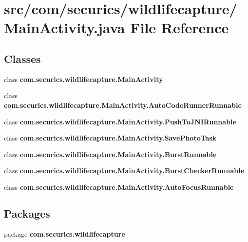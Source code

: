 \section{src/com/securics/wildlifecapture/\+Main\+Activity.java File Reference}
\label{_main_activity_8java}
\subsection*{Classes}
\begin{DoxyCompactItemize}
\item 
class {\bf com.\+securics.\+wildlifecapture.\+Main\+Activity}
\item 
class {\bf com.\+securics.\+wildlifecapture.\+Main\+Activity.\+Auto\+Code\+Runner\+Runnable}
\item 
class {\bf com.\+securics.\+wildlifecapture.\+Main\+Activity.\+Push\+To\+J\+N\+I\+Runnable}
\item 
class {\bf com.\+securics.\+wildlifecapture.\+Main\+Activity.\+Save\+Photo\+Task}
\item 
class {\bf com.\+securics.\+wildlifecapture.\+Main\+Activity.\+Burst\+Runnable}
\item 
class {\bf com.\+securics.\+wildlifecapture.\+Main\+Activity.\+Burst\+Checker\+Runnable}
\item 
class {\bf com.\+securics.\+wildlifecapture.\+Main\+Activity.\+Auto\+Focus\+Runnable}
\end{DoxyCompactItemize}
\subsection*{Packages}
\begin{DoxyCompactItemize}
\item 
package {\bf com.\+securics.\+wildlifecapture}
\end{DoxyCompactItemize}
